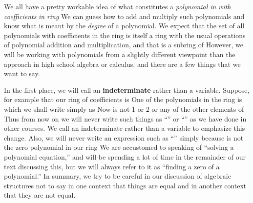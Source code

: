\documentclass[11pt,oneside]{article}
\begin{document}
\fi
\renewcommand{\BookFooter}{Section 27 Rings of Polynomials}
\ifdefined\BookMaster\else\setcounter{page}{218}\fi
\BookNarrativetrue

\begin{BookBody}



\noindent We all have a pretty workable idea of what constitutes a\textit{ polynomial in}  \textit{with coefficients} \textit{in}  \textit{ring}  We can guess how to add and multiply such polynomials and know what is meant by the\textit{ degree} of a polynomial. We expect that the set  of all polynomials with coefficients in the ring  is itself a ring with the usual operations of polynomial addition and multiplication, and that  is a subring of  However, we will be working with polynomials from a slightly different viewpoint than the approach in high school algebra or calculus, and there are a few things that we want to say.

In the first place, we will call  an\textbf{ indeterminate} rather than a variable. Suppose, for example that our ring of coefficients is  One of the polynomials in the ring  is  which we shall write simply as  Now  is not 1 or 2 or any of the other elements of  Thus from now on we will never write such things as “” or “” as we have done in other courses. We call  an indeterminate rather than a variable to emphasize this change. Also, we will never write an expression such as “” simply because  is not the zero polynomial in our ring  We are accustomed to speaking of “solving a polynomial equation,” and will be spending a lot of time in the remainder of our text discussing this, but we will always refer to it as “finding a zero of a polynomial.” In summary, we try to be careful in our discussion of algebraic structures not to say in one context that things are equal and in another context that they are not equal.


\end{BookBody}
\end{document}
